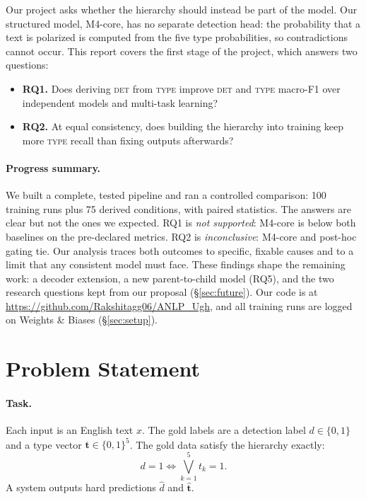 \documentclass[11pt]{article}
\newcommand{\DET}{\textsc{det}}
\newcommand{\TYPE}{\textsc{type}}
\begin{document}
Our project asks whether the hierarchy should instead be part of the model.
Our structured model, M4-core, has no separate detection head: the
probability that a text is polarized is computed from the five type
probabilities, so contradictions cannot occur. This report covers the first
stage of the project, which answers two questions:
\begin{itemize}\setlength\itemsep{1pt}
\item \textbf{RQ1.} Does deriving \DET{} from \TYPE{} improve \DET{} and
\TYPE{} macro-F1 over independent models and multi-task learning?
\item \textbf{RQ2.} At equal consistency, does building the hierarchy into
training keep more \TYPE{} recall than fixing outputs afterwards?
\end{itemize}

\paragraph{Progress summary.}
We built a complete, tested pipeline and ran a controlled comparison: 100
training runs plus 75 derived conditions, with paired statistics. The
answers are clear but not the ones we expected. RQ1 is \emph{not
supported}: M4-core is below both baselines on the pre-declared metrics.
RQ2 is \emph{inconclusive}: M4-core and post-hoc gating tie. Our analysis
traces both outcomes to specific, fixable causes and to a limit that any
consistent model must face. These findings shape the remaining work: a decoder extension, a new
parent-to-child model (RQ5), and the two research questions kept from our
proposal (\S\ref{sec:future}). Our code is at
\url{https://github.com/Rakshitagg06/ANLP_Ugh}, and all training runs are
logged on Weights \& Biases (\S\ref{sec:setup}).

\section{Problem Statement}
\label{sec:problem}

\paragraph{Task.}
Each input is an English text $x$. The gold labels are a detection label
$d \in \{0,1\}$ and a type vector $\mathbf{t} \in \{0,1\}^5$. The gold data
satisfy the hierarchy exactly:
\begin{equation}
d = 1 \iff \textstyle\bigvee_{k=1}^{5} t_k = 1 .
\label{eq:hier}
\end{equation}
A system outputs hard predictions $\hat d$ and $\hat{\mathbf t}$.
\end{document}
